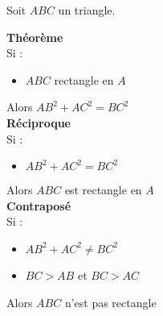 {%
}


{Soit $ABC$ un triangle.\\
\begin{multicols}{3}
\textbf{Théorème}\\
    Si : 
\begin{itemize}
    \item $ABC$ rectangle en $A$
\end{itemize} 
Alors $AB^2+AC^2=BC^2$\\
\vfill\break
\textbf{Réciproque}\\
Si : 
\begin{itemize}
    \item $AB^2+AC^2=BC^2$
\end{itemize} 
Alors $ABC$ est rectangle en $A$\\
\vfill\break
\textbf{Contraposé}\\
Si : 
\begin{itemize}
    \item $AB^2+AC^2\neq BC^2$
    \item $BC>AB$ et $BC>AC$
\end{itemize} 
Alors $ABC$ n'est pas rectangle
\end{multicols}
}


